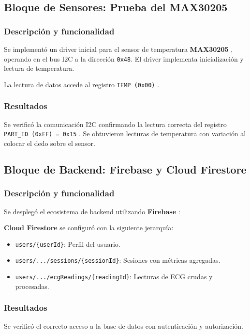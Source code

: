 \documentclass[letterpaper,11pt]{article}
\begin{document}
\subsection{Bloque de Sensores: Prueba del MAX30205}

\subsubsection{Descripción y funcionalidad}
Se implementó un driver inicial para el sensor de temperatura \textbf{MAX30205} \citep{max30205_ds}, operando en el bus I2C a la dirección \texttt{0x48}. El driver implementa inicialización y lectura de temperatura.

La lectura de datos accede al registro \texttt{TEMP (0x00)} \citep{max30205_ds}.

\subsubsection{Resultados}
Se verificó la comunicación I2C confirmando la lectura correcta del registro \texttt{PART\_ID (0xFF) = 0x15} \citep{max30205_ds}. Se obtuvieron lecturas de temperatura con variación al colocar el dedo sobre el sensor.

\subsection{Bloque de Backend: Firebase y Cloud Firestore}

\subsubsection{Descripción y funcionalidad}
Se desplegó el ecosistema de backend utilizando \textbf{Firebase} \citep{firebase_docs}:

\textbf{Cloud Firestore} se configuró con la siguiente jerarquía:
\begin{itemize}
    \item \texttt{users/\{userId\}}: Perfil del usuario.
    \item \texttt{users/.../sessions/\{sessionId\}}: Sesiones con métricas agregadas.
    \item \texttt{users/.../ecgReadings/\{readingId\}}: Lecturas de ECG crudas y procesadas.
\end{itemize}

\subsubsection{Resultados}
Se verificó el correcto acceso a la base de datos con autenticación y autorización.
\end{document}
